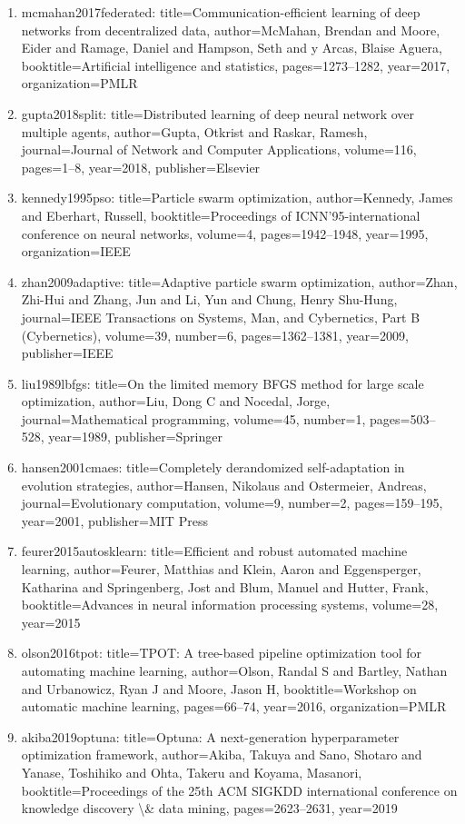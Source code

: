 \documentclass[11pt]{article}
\begin{document}
\begin{enumerate}[leftmargin=*]
  \item mcmahan2017federated: title=Communication-efficient learning of deep networks from decentralized data, author=McMahan, Brendan and Moore, Eider and Ramage, Daniel and Hampson, Seth and y Arcas, Blaise Aguera, booktitle=Artificial intelligence and statistics, pages=1273--1282, year=2017, organization=PMLR
  \item gupta2018split: title=Distributed learning of deep neural network over multiple agents, author=Gupta, Otkrist and Raskar, Ramesh, journal=Journal of Network and Computer Applications, volume=116, pages=1--8, year=2018, publisher=Elsevier
  \item kennedy1995pso: title=Particle swarm optimization, author=Kennedy, James and Eberhart, Russell, booktitle=Proceedings of ICNN'95-international conference on neural networks, volume=4, pages=1942--1948, year=1995, organization=IEEE
  \item zhan2009adaptive: title=Adaptive particle swarm optimization, author=Zhan, Zhi-Hui and Zhang, Jun and Li, Yun and Chung, Henry Shu-Hung, journal=IEEE Transactions on Systems, Man, and Cybernetics, Part B (Cybernetics), volume=39, number=6, pages=1362--1381, year=2009, publisher=IEEE
  \item liu1989lbfgs: title=On the limited memory BFGS method for large scale optimization, author=Liu, Dong C and Nocedal, Jorge, journal=Mathematical programming, volume=45, number=1, pages=503--528, year=1989, publisher=Springer
  \item hansen2001cmaes: title=Completely derandomized self-adaptation in evolution strategies, author=Hansen, Nikolaus and Ostermeier, Andreas, journal=Evolutionary computation, volume=9, number=2, pages=159--195, year=2001, publisher=MIT Press
  \item feurer2015autosklearn: title=Efficient and robust automated machine learning, author=Feurer, Matthias and Klein, Aaron and Eggensperger, Katharina and Springenberg, Jost and Blum, Manuel and Hutter, Frank, booktitle=Advances in neural information processing systems, volume=28, year=2015
  \item olson2016tpot: title=TPOT: A tree-based pipeline optimization tool for automating machine learning, author=Olson, Randal S and Bartley, Nathan and Urbanowicz, Ryan J and Moore, Jason H, booktitle=Workshop on automatic machine learning, pages=66--74, year=2016, organization=PMLR
  \item akiba2019optuna: title=Optuna: A next-generation hyperparameter optimization framework, author=Akiba, Takuya and Sano, Shotaro and Yanase, Toshihiko and Ohta, Takeru and Koyama, Masanori, booktitle=Proceedings of the 25th ACM SIGKDD international conference on knowledge discovery \textbackslash{}\& data mining, pages=2623--2631, year=2019

\end{enumerate}
\end{document}
